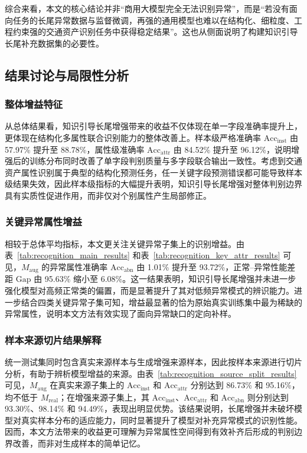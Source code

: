 综合来看，本文的核心结论并非“商用大模型完全无法识别异常”，而是“若没有面向任务的长尾异常数据与监督微调，再强的通用模型也难以在结构化、细粒度、工程约束强的交通资产识别任务中获得稳定结果”。这也从侧面说明了构建知识引导长尾补充数据集的必要性。

\subsection{结果讨论与局限性分析}

\subsubsection{整体增益特征}

从总体结果看，知识引导长尾增强带来的收益不仅体现在单一字段准确率提升上，更体现在结构化多属性联合识别能力的整体改善上。样本级严格准确率 $\mathrm{Acc}_{\mathrm{inst}}$ 由 57.97\% 提升至 88.78\%，属性级准确率 $\mathrm{Acc}_{\mathrm{attr}}$ 由 84.52\% 提升至 96.12\%，说明增强后的训练分布同时改善了单字段判别质量与多字段联合输出一致性。考虑到交通资产属性识别属于典型的结构化预测任务，任一关键字段预测错误都可能导致样本级结果失效，因此样本级指标的大幅提升表明，知识引导长尾增强对整体判别边界具有实质性促进作用，而非仅对个别属性产生局部修正。

\subsubsection{关键异常属性增益}

相较于总体平均指标，本文更关注关键异常子集上的识别增益。由表~\ref{tab:recognition_main_results} 和表~\ref{tab:recognition_key_attr_results} 可见，$M_{\mathrm{aug}}$ 的异常属性准确率 $\mathrm{Acc}_{\mathrm{abn}}$ 由 1.01\% 提升至 93.72\%，正常--异常性能差距 $\mathrm{Gap}$ 由 95.63\% 缩小至 6.08\%。这一结果表明，知识引导长尾增强并未进一步强化模型对高频正常类的偏置，而是显著提升了其对低频异常模式的辨识能力。进一步结合四类关键异常子集可知，增益最显著的恰为原始真实训练集中最为稀缺的异常属性，说明本文方法有效实现了面向异常缺口的定向补样。

\subsubsection{样本来源切片结果解释}

统一测试集同时包含真实来源样本与生成增强来源样本，因此按样本来源进行切片分析，有助于辨析模型增益的来源。由表~\ref{tab:recognition_source_split_results} 可见，$M_{\mathrm{aug}}$ 在真实来源子集上的 $\mathrm{Acc}_{\mathrm{inst}}$ 和 $\mathrm{Acc}_{\mathrm{attr}}$ 分别达到 86.73\% 和 95.16\%，均不低于 $M_{\mathrm{real}}$；在增强来源子集上，其 $\mathrm{Acc}_{\mathrm{inst}}$、$\mathrm{Acc}_{\mathrm{attr}}$ 和 $\mathrm{Acc}_{\mathrm{abn}}$ 则分别达到 93.30\%、98.14\% 和 94.49\%，表现出明显优势。该结果说明，长尾增强并未破坏模型对真实样本分布的适应能力，同时显著提升了模型对补充异常模式的识别性能。因而，本文方法带来的收益更可理解为异常属性空间得到有效补齐后形成的判别边界改善，而非对生成样本的简单记忆。

